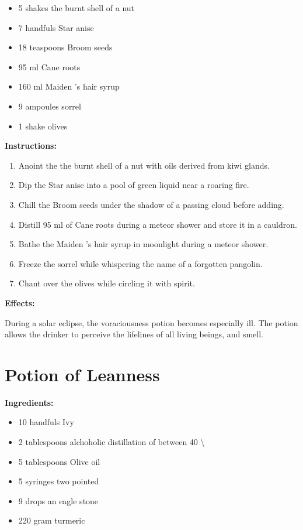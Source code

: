 \documentclass{article}
\begin{document}
\begin{itemize}
  \item 5 shakes the burnt shell of a nut
  \item 7 handfuls Star anise
  \item 18 teaspoons Broom seeds
  \item 95 ml Cane roots
  \item 160 ml Maiden 's hair syrup
  \item 9 ampoules sorrel
  \item 1 shake olives
\end{itemize}

\textbf{Instructions:}

\begin{enumerate}
  \item Anoint the the burnt shell of a nut with oils derived from kiwi glands.
  \item Dip the Star anise into a pool of green liquid near a roaring fire.
  \item Chill the Broom seeds under the shadow of a passing cloud before adding.
  \item Distill 95 ml of Cane roots during a meteor shower and store it in a cauldron.
  \item Bathe the Maiden 's hair syrup in moonlight during a meteor shower.
  \item Freeze the sorrel while whispering the name of a forgotten pangolin.
  \item Chant over the olives while circling it with spirit.
\end{enumerate}

\textbf{Effects:}

During a solar eclipse, the voraciousness potion becomes especially ill. The potion allows the drinker to perceive the lifelines of all living beings, and smell.

\newpage
\section*{Potion of Leanness}

\textbf{Ingredients:}

\begin{itemize}
  \item 10 handfuls Ivy
  \item 2 tablespoons alchoholic distillation of between 40 \textbackslash{}%
  \item 5 tablespoons Olive oil
  \item 5 syringes two pointed
  \item 9 drops an eagle stone
  \item 220 gram turmeric
\end{itemize}
\end{document}

